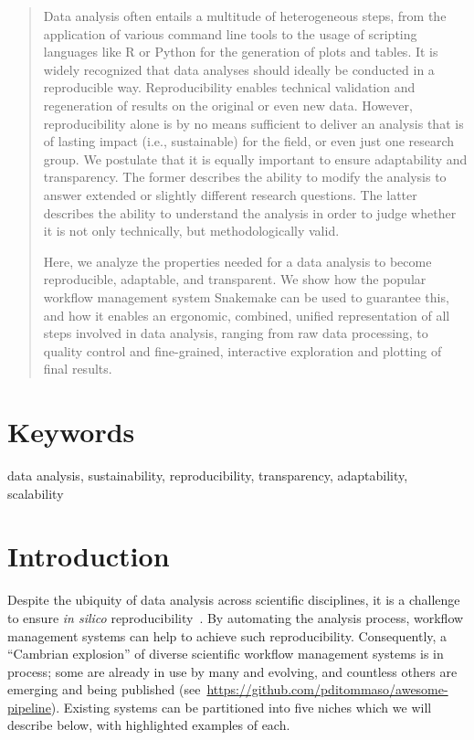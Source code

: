 \documentclass[10pt,a4paper,twocolumn]{article}
\let\plainurl\url
\renewcommand{\url}[1]{\protect\plainurl{#1}}
\begin{document}
\begin{abstract}
	Data analysis often entails a multitude of heterogeneous steps, from the application of various command line tools to the usage of scripting languages like R or Python for the generation of plots and tables.
	It is widely recognized that data analyses should ideally be conducted in a reproducible way.
	Reproducibility enables technical validation and regeneration of results on the original or even new data.
	However, reproducibility alone is by no means sufficient to deliver an analysis that is of lasting impact (i.e., sustainable) for the field, or even just one research group.
	We postulate that it is equally important to ensure adaptability and transparency.
	The former describes the ability to modify the analysis to answer extended or slightly different research questions.
	The latter describes the ability to understand the analysis in order to judge whether it is not only technically, but methodologically valid.

	Here, we analyze the properties needed for a data analysis to become reproducible, adaptable, and transparent.
	We show how the popular workflow management system Snakemake can be used to guarantee this, and how it enables an ergonomic, combined, unified representation of all steps involved in data analysis, ranging from raw data processing, to quality control and fine-grained, interactive exploration and plotting of final results.
\end{abstract}

\section*{Keywords}

data analysis, sustainability, reproducibility, transparency, adaptability, scalability

\clearpage

\section{Introduction}\label{sec:introduction}

Despite the ubiquity of data analysis across scientific disciplines, it is a challenge to ensure \emph{in silico} reproducibility~\parencite{Mesirov2010,Baker2016,Munaf__2017}.
By automating the analysis process, workflow management systems can help to achieve such reproducibility.
Consequently, a ``Cambrian explosion'' of diverse scientific workflow management systems is in process; some are already in use by many and evolving, and countless others are emerging and being published (see~\url{https://github.com/pditommaso/awesome-pipeline}).
Existing systems can be partitioned into five niches which we will describe below, with highlighted examples of each.
\end{document}
